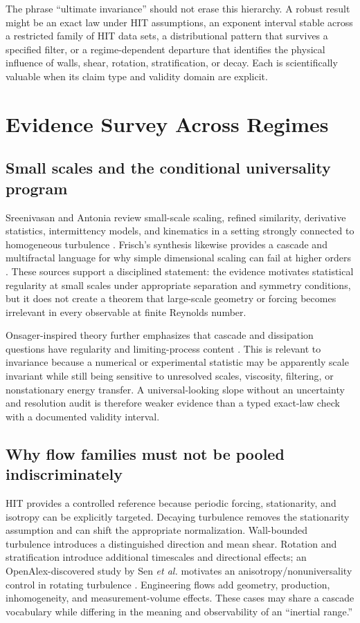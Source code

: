 \documentclass[conference]{../../../../Conference-LaTeX-template_10-17-19/IEEEtran}
\begin{document}
The phrase ``ultimate invariance'' should not erase this hierarchy. A robust result might be an exact law under HIT assumptions, an exponent interval stable across a restricted family of HIT data sets, a distributional pattern that survives a specified filter, or a regime-dependent departure that identifies the physical influence of walls, shear, rotation, stratification, or decay. Each is scientifically valuable when its claim type and validity domain are explicit.

\section{Evidence Survey Across Regimes}
\subsection{Small scales and the conditional universality program}
Sreenivasan and Antonia review small-scale scaling, refined similarity, derivative statistics, intermittency models, and kinematics in a setting strongly connected to homogeneous turbulence \cite{sreenivasan_antonia_1997}. Frisch's synthesis likewise provides a cascade and multifractal language for why simple dimensional scaling can fail at higher orders \cite{frisch_1995}. These sources support a disciplined statement: the evidence motivates statistical regularity at small scales under appropriate separation and symmetry conditions, but it does not create a theorem that large-scale geometry or forcing becomes irrelevant in every observable at finite Reynolds number.

Onsager-inspired theory further emphasizes that cascade and dissipation questions have regularity and limiting-process content \cite{eyink_sreenivasan_2006}. This is relevant to invariance because a numerical or experimental statistic may be apparently scale invariant while still being sensitive to unresolved scales, viscosity, filtering, or nonstationary energy transfer. A universal-looking slope without an uncertainty and resolution audit is therefore weaker evidence than a typed exact-law check with a documented validity interval.

\subsection{Why flow families must not be pooled indiscriminately}
HIT provides a controlled reference because periodic forcing, stationarity, and isotropy can be explicitly targeted. Decaying turbulence removes the stationarity assumption and can shift the appropriate normalization. Wall-bounded turbulence introduces a distinguished direction and mean shear. Rotation and stratification introduce additional timescales and directional effects; an OpenAlex-discovered study by Sen \emph{et al.} motivates an anisotropy/nonuniversality control in rotating turbulence \cite{sen_2012}. Engineering flows add geometry, production, inhomogeneity, and measurement-volume effects. These cases may share a cascade vocabulary while differing in the meaning and observability of an ``inertial range.''
\end{document}
